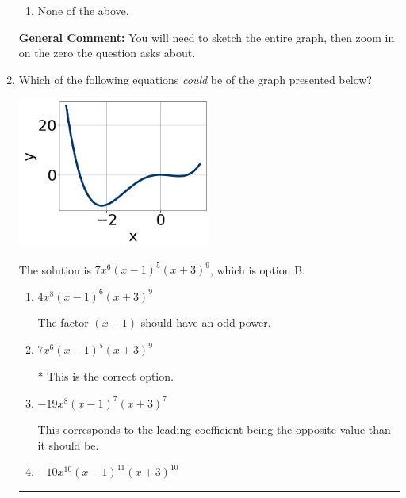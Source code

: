 \documentclass{extbook}[14pt]
\newcommand{\litem}[1]{\item #1

\rule{\textwidth}{0.4pt}}
\begin{document}
\begin{enumerate}
{\begin{enumerate}[label=\Alph*.]
\item None of the above.\end{enumerate}
\textbf{General Comment:} You will need to sketch the entire graph, then zoom in on the zero the question asks about.
}
\litem{
Which of the following equations \textit{could} be of the graph presented below?

\begin{center}
    \includegraphics[width=0.5\textwidth]{../Figures/polyGraphToFunctionCopyB.png}
\end{center}




The solution is \( 7x^{6} (x - 1)^{5} (x + 3)^{9} \), which is option B.\begin{enumerate}[label=\Alph*.]
\item \( 4x^{8} (x - 1)^{6} (x + 3)^{9} \)

The factor $(x - 1)$ should have an odd power.
\item \( 7x^{6} (x - 1)^{5} (x + 3)^{9} \)

* This is the correct option.
\item \( -19x^{8} (x - 1)^{7} (x + 3)^{7} \)

This corresponds to the leading coefficient being the opposite value than it should be.
\item \( -10x^{10} (x - 1)^{11} (x + 3)^{10} \)


\end{enumerate}}
\end{enumerate}
\end{document}
